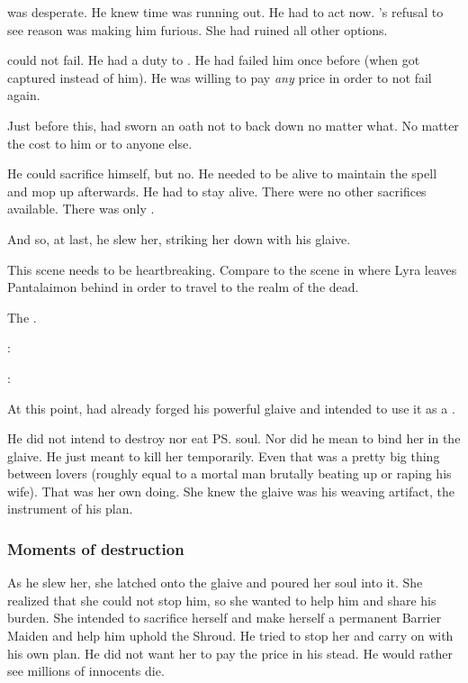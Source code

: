 \Ishnaruchaefir was desperate.
He knew time was running out.
He had to act now.
\Rystessakhin's refusal to see reason was making him furious.
She had ruined all other options.

\Ishnaruchaefir could not fail. 
He had a duty to \Nexagglachel.
He had failed him once before (when \Nexagglachel got captured instead of him). 
He was willing to pay \emph{any} price in order to not fail \Nexagglachel again. 

Just before this, \Ishnaruchaefir had sworn an oath not to back down no matter what. 
No matter the cost to him or to anyone else. 

He could sacrifice himself, but no. 
He needed to be alive to maintain the spell and mop up afterwards. 
He had to stay alive. 
There were no other sacrifices available. 
There was only \Rystessakhin. 

And so, at last, he slew her, striking her down with his glaive.

This scene needs to be heartbreaking. 
Compare to the scene in \cite{PhillipPullman:TheAmberSpyglass} where Lyra leaves Pantalaimon behind in order to travel to the realm of the dead. 

The \dragons {}. 

\begin{prose}
  \Ishnaruchaefir:
  
  \Rystessakhin:
\end{prose}

At this point, \Ishnaruchaefir{} had already forged his powerful glaive and intended to use it as a . 

He did not intend to destroy nor eat \ps{\Aeocrith} soul. 
Nor did he mean to bind her in the glaive. 
He just meant to kill her temporarily. 
Even that was a pretty big thing between lovers (roughly equal to a mortal man brutally beating up or raping his wife). 
That was her own doing. 
She knew the glaive was his weaving artifact, the instrument of his plan.





\subsubsection{Moments of destruction}
As he slew her, she latched onto the glaive and poured her soul into it. 
She realized that she could not stop him, so she wanted to help him and share his burden. 
She intended to sacrifice herself and make herself a permanent Barrier Maiden and help him uphold the Shroud. 
He tried to stop her and carry on with his own plan. 
He did not want her to pay the price in his stead. 
He would rather see millions of innocents die. 

